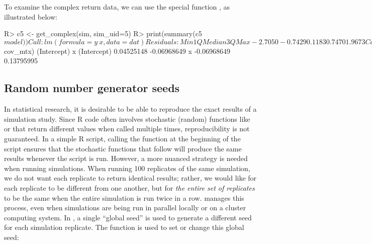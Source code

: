 
To examine the complex return data, we can use the special function , as illustrated below:

\begin{example}
R> c5 <- get_complex(sim, sim_uid=5)
R> print(summary(c5$model))
Call:
lm(formula = y ~ x, data = dat)

Residuals:
    Min      1Q  Median      3Q     Max
-2.7050 -0.7429  0.1183  0.7470  1.9673

Coefficients:
            Estimate Std. Error t value Pr(>|t|)
(Intercept)   3.0660     0.2127  14.413  < 2e-16 ***
x             2.0976     0.3714   5.647 1.59e-07 ***
---
Signif. codes:  0 ‘***’ 0.001 ‘**’ 0.01 ‘*’ 0.05 ‘.’ 0.1 ‘ ’ 1

Residual standard error: 1.003 on 98 degrees of freedom
Multiple R-squared:  0.2455,	Adjusted R-squared:  0.2378
F-statistic: 31.89 on 1 and 98 DF,  p-value: 1.593e-07
R> print(c5$cov_mtx)
            (Intercept)           x
(Intercept)  0.04525148 -0.06968649
x           -0.06968649  0.13795995
\end{example}

\subsection{Random number generator seeds}

In statistical research, it is desirable to be able to reproduce the exact results of a simulation study. Since R code often involves stochastic (random) functions like  or  that return different values when called multiple times, reproducibility is not guaranteed. In a simple R script, calling the  function at the beginning of the script ensures that the stochastic functions that follow will produce the same results whenever the script is run. However, a more nuanced strategy is needed when running simulations. When running 100 replicates of the same simulation, we do not want each replicate to return identical results; rather, we would like for each replicate to be different from one another, but for \textit{the entire set of replicates} to be the same when the entire simulation is run twice in a row.  manages this process, even when simulations are being run in parallel locally or on a cluster computing system. In , a single ``global seed'' is used to generate a different seed for each simulation replicate. The  function is used to set or change this global seed:

